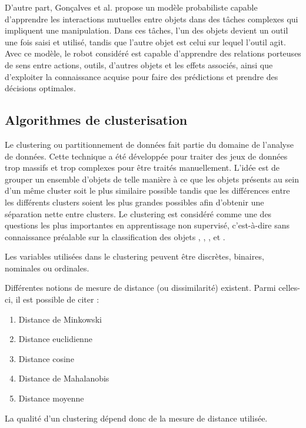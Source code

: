 \documentclass[draft]{llncs}
\begin{document}
D'autre part, Gonçalves et al. \cite{Goncalves2014} propose un modèle probabiliste capable d'apprendre les interactions mutuelles entre objets dans des tâches complexes qui impliquent une manipulation.
Dans ces tâches, l'un des objets devient un outil une fois saisi et utilisé, tandis que l'autre objet est celui sur lequel l'outil agit.
Avec ce modèle, le robot considéré est capable d'apprendre des relations porteuses de sens entre actions, outils, d'autres objets et les effets associés, ainsi que d'exploiter la connaissance acquise pour faire des prédictions et prendre des décisions optimales.




\subsection{Algorithmes de clusterisation}

Le clustering ou partitionnement de données fait partie du domaine de l'analyse de données.
Cette technique a été développée pour traiter des jeux de données trop massifs et trop complexes pour être traités manuellement.
L'idée est de grouper un ensemble d'objets de telle manière à ce que les objets présents au sein d'un même cluster soit le plus similaire possible tandis que les différences entre les différents clusters soient les plus grandes possibles afin d'obtenir une séparation nette entre clusters.
Le clustering est considéré comme une des questions les plus importantes en apprentissage non supervisé, c'est-à-dire sans connaissance préalable sur la classification des objets \cite{Xu2015}, \cite{Andreopoulos2009}, \cite{Fahad2014}, \cite{Tan2005} et \cite{Sajana2016}.

Les variables utilisées dans le clustering peuvent être discrètes, binaires, nominales ou ordinales.

Différentes notions de mesure de distance (ou dissimilarité) existent. Parmi celles-ci, il est possible de citer :

\begin{enumerate}
  \item Distance de Minkowski
  \item Distance euclidienne
  \item Distance cosine
  \item Distance de Mahalanobis
  \item Distance moyenne
\end{enumerate}

La qualité d'un clustering dépend donc de la mesure de distance utilisée.
\end{document}
